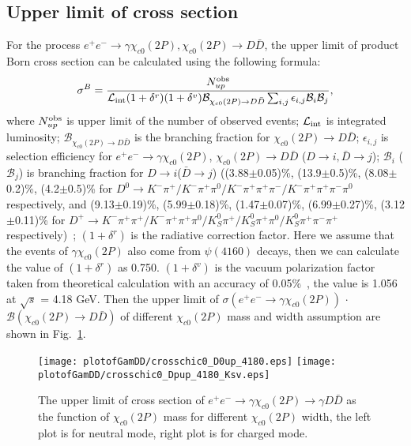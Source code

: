 \documentclass[aps,preprint,tightenlines,superscriptaddress,showpacs,byrevtex,amsmath,amssymb,nofloatfix]{revtex4}
\begin{document}
\subsection{Upper limit of cross section}

For the process $e^{+}e^{-} \rightarrow \gamma \chi_{c0}(2P), \chi_{c0}(2P) \to D\bar{D}$, the upper limit of product Born cross section can be calculated using the following formula:
\begin{equation}
  \sigma^{B} = \frac{N^{\rm obs}_{up}}{\mathcal{L}_{\rm int} (1+\delta^{r}) (1+\delta^{v}) \mathcal{B}_{\chi_{c0}(2P)\rightarrow D\bar{D}} \sum_{i,j}\epsilon_{i,j} \mathcal{B}_{i}\mathcal{B}_{j}},
\end{equation}
where $N^{\rm obs}_{up}$ is upper limit of the number of observed events; $\mathcal{L}_{\rm int}$ is integrated luminosity; $\mathcal{B}_{\chi_{c0}(2P)\rightarrow D\bar{D}}$ is the branching fraction for $\chi_{c0}(2P) \rightarrow D\bar{D}$;  $\epsilon_{i,j}$ is selection efficiency for $e^{+}e^{-} \rightarrow  \gamma \chi_{c0} (2P)$, $\chi_{c0} (2P) \rightarrow D\bar{D}$ ($D\rightarrow i, \bar{D}\rightarrow j$); $\mathcal{B}_{i}$ ($\mathcal{B}_{j}$) is branching fraction for $D\rightarrow i$($\bar{D}\rightarrow j$) ((3.88$\pm$0.05)\%, (13.9$\pm$0.5)\%, (8.08$\pm$0.2)\%, (4.2$\pm$0.5)\% for $D^{0} \rightarrow K^{-}\pi^{+}/K^{-}\pi^{+}\pi^{0}/K^{-}\pi^{+}\pi^{+}\pi^{-}/K^{-}\pi^{+}\pi^{+}\pi^{-}\pi^{0}$ respectively, and (9.13$\pm$0.19)\%, (5.99$\pm$0.18)\%, (1.47$\pm$0.07)\%, (6.99$\pm$0.27)\%, (3.12$\pm$0.11)\% for $D^{+} \rightarrow K^{-}\pi^{+}\pi^{+}/K^{-}\pi^{+}\pi^{+}\pi^{0}/ K^{0}_{S}\pi^{+}/K^{0}_{S}\pi^{+}\pi^{0}/K^{0}_{S}\pi^{+}\pi^{-}\pi^{+}$ respectively)~\cite{PDG};  $(1+\delta^{r})$ is the radiative correction factor. Here we assume that the events of $\gamma \chi_{c0} (2P)$ also come from $\psi(4160)$ decays, then we can calculate the value of  $(1+\delta^{r})$ as 0.750. $(1+\delta^{v})$ is the vacuum polarization factor taken from theoretical calculation with an accuracy of 0.05\%~\cite{vpcalculation}, the value is 1.056 at $\sqrt{s}$ = 4.18 GeV. Then the upper limit of $\sigma (e^{+}e^{-}\rightarrow \gamma \chi_{c0} (2P))$ $\cdot$ $\mathcal{B}(\chi_{c0} (2P)\rightarrow D\bar{D})$ of different $\chi_{c0} (2P)$ mass and width assumption are shown in Fig.~\ref{crosschic0_up}.


\begin{figure}[!htbp]
\captionsetup{justification=raggedright}

    \texttt{[image: plotofGamDD/crosschic0\_D0up\_4180.eps]}
    \texttt{[image: plotofGamDD/crosschic0\_Dpup\_4180\_Ksv.eps]}

  \caption{\small The upper limit of cross section of $e^{+}e^{-}\rightarrow \gamma \chi_{c0} (2P)\rightarrow \gamma D\bar{D}$ as the function of $\chi_{c0} (2P)$ mass for different $\chi_{c0} (2P)$ width, the left plot is for neutral mode, right plot is for charged mode.}
  \label{crosschic0_up}
\end{figure}
\end{document}

